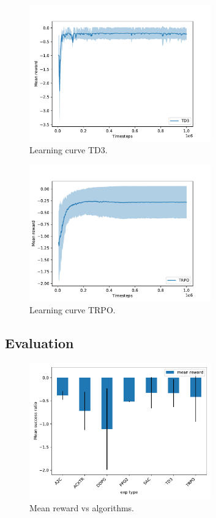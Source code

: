 \documentclass{article}
\begin{document}
\begin{figure}[H]
    \centering
    \includegraphics[width=0.7\textwidth]{../TD3.pdf}
\caption{Learning curve TD3.}
\end{figure}

\begin{figure}[H]
    \centering
    \includegraphics[width=0.7\textwidth]{../TRPO.pdf}
\caption{Learning curve TRPO.}
\end{figure}



\subsection{Evaluation}


\begin{figure}[H]
    \centering
    \includegraphics[width=0.7\textwidth]{../mean_reward.pdf}
\caption{Mean reward vs algorithms.}
\end{figure}
\end{document}
